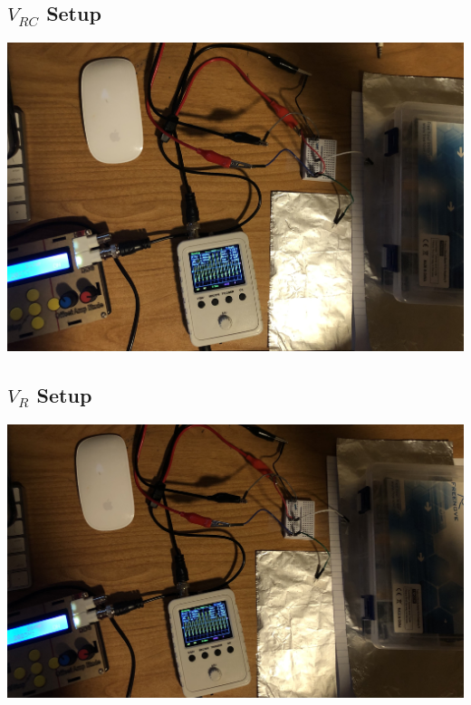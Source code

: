 \documentclass{article}
\begin{document}
\begin{center}
  \subsection*{\(V_{RC}\) Setup}
  \includegraphics[scale=0.07]{VRC.jpeg}
  \subsection*{\(V_{R}\) Setup}
  \includegraphics[scale=0.07]{VR.jpeg}
\end{center}
\end{document}
